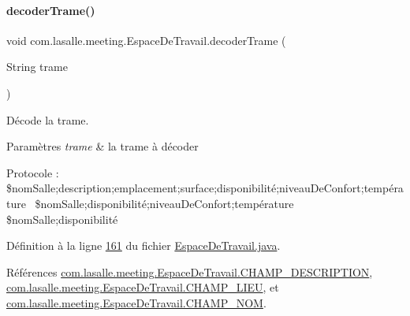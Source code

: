\paragraph{\texorpdfstring{decoder\+Trame()}{decoderTrame()}}
{\footnotesize\ttfamily void com.\+lasalle.\+meeting.\+Espace\+De\+Travail.\+decoder\+Trame (\begin{DoxyParamCaption}\item[{String}]{trame }\end{DoxyParamCaption})}



Décode la trame. 


\begin{DoxyParams}{Paramètres}
{\em trame} & la trame à décoder \\
\hline
\end{DoxyParams}
Protocole \+: \$nom\+Salle;description;emplacement;surface;disponibilité;niveau\+De\+Confort;température~\newline
\$nom\+Salle;disponibilité;niveau\+De\+Confort;température~\newline
\$nom\+Salle;disponibilité~\newline
 

Définition à la ligne \hyperlink{_espace_de_travail_8java_source_l00161}{161} du fichier \hyperlink{_espace_de_travail_8java_source}{Espace\+De\+Travail.\+java}.



Références \hyperlink{_espace_de_travail_8java_source_l00045}{com.\+lasalle.\+meeting.\+Espace\+De\+Travail.\+C\+H\+A\+M\+P\+\_\+\+D\+E\+S\+C\+R\+I\+P\+T\+I\+ON}, \hyperlink{_espace_de_travail_8java_source_l00046}{com.\+lasalle.\+meeting.\+Espace\+De\+Travail.\+C\+H\+A\+M\+P\+\_\+\+L\+I\+EU}, et \hyperlink{_espace_de_travail_8java_source_l00044}{com.\+lasalle.\+meeting.\+Espace\+De\+Travail.\+C\+H\+A\+M\+P\+\_\+\+N\+OM}.



